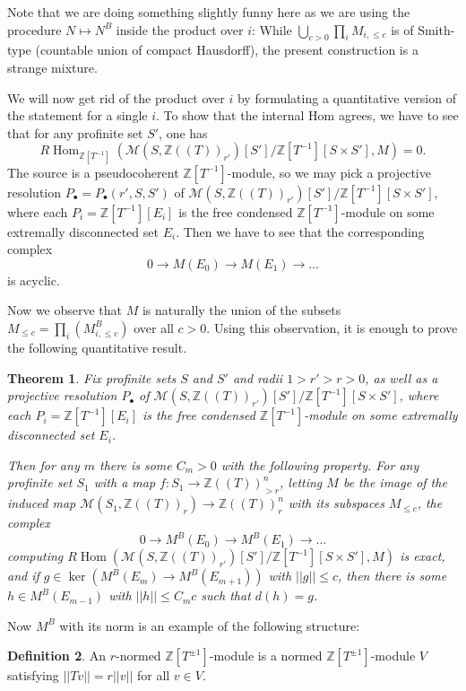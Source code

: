 \documentclass[11pt]{amsbook}
\DeclareMathOperator{\Hom}{Hom}
\numberwithin{equation}{section}
\newtheorem{theorem}{Theorem}
\numberwithin{theorem}{section}
\theoremstyle{definition}
\newtheorem{definition}[theorem]{Definition}
\begin{document}
Note that we are doing something slightly funny here as we are using the procedure $N\mapsto N^B$ inside the product over $i$: While $\bigcup_{c>0} \prod_i M_{i,\leq c}$ is of Smith-type (countable union of compact Hausdorff), the present construction is a strange mixture.

We will now get rid of the product over $i$ by formulating a quantitative version of the statement for a single $i$. To show that the internal Hom agrees, we have to see that for any profinite set $S'$, one has
\[
R\Hom_{\mathbb Z[T^{-1}]}(\mathcal M(S,\mathbb Z((T))_{r'})[S']/\mathbb Z[T^{-1}][S\times S'],M) = 0.
\]
The source is a pseudocoherent $\mathbb Z[T^{-1}]$-module, so we may pick a projective resolution $P_\bullet = P_\bullet(r',S,S')$ of $\mathcal M(S,\mathbb Z((T))_{r'})[S']/\mathbb Z[T^{-1}][S\times S']$, where each $P_i = \mathbb Z[T^{-1}][E_i]$ is the free condensed $\mathbb Z[T^{-1}]$-module on some extremally disconnected set $E_i$. Then we have to see that the corresponding complex
\[
0\to M(E_0)\to M(E_1)\to \ldots
\]
is acyclic.

Now we observe that $M$ is naturally the union of the subsets $M_{\leq c}=\prod_i(M_{i,\leq c}^B)$ over all $c>0$. Using this observation, it is enough to prove the following quantitative result.

\begin{theorem}\label{thm:constants} Fix profinite sets $S$ and $S'$ and radii $1>r'>r>0$, as well as a projective resolution $P_\bullet$ of $\mathcal M(S,\mathbb Z((T))_{r'})[S']/\mathbb Z[T^{-1}][S\times S']$, where each $P_i = \mathbb Z[T^{-1}][E_i]$ is the free condensed $\mathbb Z[T^{-1}]$-module on some extremally disconnected set $E_i$.

Then for any $m$ there is some $C_m>0$ with the following property. For any profinite set $S_1$ with a map $f: S_1\to \mathbb Z((T))_{>r}^n$, letting $M$ be the image of the induced map $\mathcal M(S_1,\mathbb Z((T))_r)\to \mathbb Z((T))_r^n$ with its subspaces $M_{\leq c}$, the complex
\[
0\to M^B(E_0)\to M^B(E_1)\to \ldots
\]
computing $R\Hom(\mathcal M(S,\mathbb Z((T))_{r'})[S']/\mathbb Z[T^{-1}][S\times S'],M)$ is exact, and if $g\in \ker(M^B(E_m)\to M^B(E_{m+1}))$ with $||g||\leq c$, then there is some $h\in M^B(E_{m-1})$ with $||h||\leq C_mc$ such that $d(h)=g$.
\end{theorem}

Now $M^B$ with its norm is an example of the following structure:

\begin{definition} An $r$-normed $\mathbb Z[T^{\pm 1}]$-module is a normed $\mathbb Z[T^{\pm 1}]$-module $V$ satisfying $||T v||=r||v||$ for all $v\in V$.
\end{definition}
\end{document}
